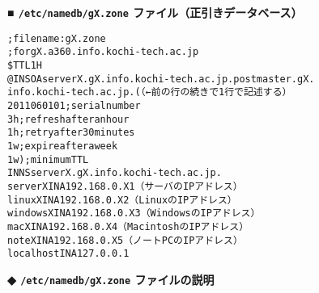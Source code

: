 \textbf{■ \texttt{/etc/namedb/gX.zone} ファイル（正引きデータベース）}
\begin{center}
\begin{breakbox}
\begin{alltt}
; file name: gX.zone
; for gX.a360.info.kochi-tech.ac.jp
\$TTL       1H
@          IN      SOA     serverX.gX.info.kochi-tech.ac.jp. postmaster.gX.
info.kochi-tech.ac.jp. (          （←{\rm{}前の行の続きで1行で記述する}）
                   2011060101	      ; serial number
                   3h			; refresh after an hour
                   1h			; retry after 30 minutes
                   1w			; expire after a week
                   1w )			; minimum TTL
           IN      NS      serverX.gX.info.kochi-tech.ac.jp.
serverX    IN      A       192.168.0.X1  （{\rm{}サーバのIPアドレス}）
linuxX     IN      A       192.168.0.X2  （{\rm{}LinuxのIPアドレス}）
windowsX   IN      A       192.168.0.X3  （{\rm{}WindowsのIPアドレス}）
macX       IN      A       192.168.0.X4  （{\rm{}MacintoshのIPアドレス}）
noteX      IN      A       192.168.0.X5  （{\rm{}ノートPCのIPアドレス}）
localhost  IN      A       127.0.0.1
\end{alltt}
\end{breakbox}
\end{center}
\noindent
\textbf{◆ \texttt{/etc/namedb/gX.zone} ファイルの説明}

